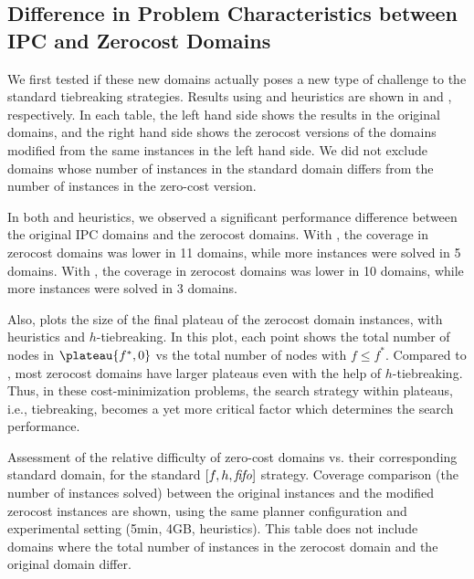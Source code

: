 \subsection{Difference in Problem Characteristics between IPC and Zerocost Domains}

We first tested if these new domains actually poses a new type of challenge to the
standard tiebreaking strategies. Results using \lmcut and \mands
heuristics are shown in  and
, respectively. In each table, the left
hand side shows the results in the original domains, and the right hand side
shows the zerocost versions of the domains modified from the same
instances in the left hand side. We did not exclude domains whose
number of instances in the standard domain differs from the number of instances in the zero-cost version.

In both \lmcut and \mands heuristics, we observed a significant
performance difference between the original IPC domains and the zerocost
domains. With \lmcut, the coverage in zerocost domains
was lower in 11 domains, while more instances were solved
in 5 domains. With \mands, the coverage in zerocost domains was lower in 10 domains, while
more instances were solved in 3 domains.

Also,  plots the size of the final plateau of the
zerocost domain instances, with \lmcut heuristics and $h$-tiebreaking. In this plot,
each point shows the total number of nodes in $\plateau{f^*,0}$ vs the
total number of nodes with $f\leq f^*$. Compared to ,
most zerocost domains have larger plateaus even with the help of
$h$-tiebreaking.  Thus, in these cost-minimization problems, the search
strategy within plateaus, i.e., tiebreaking, becomes a yet more critical
factor which determines the search performance.


\begin{table}[htbp]
 \centering
 
 \caption{
 Assessment of the relative difficulty of zero-cost domains vs. their corresponding standard domain, for the standard $[f,h,{\text{\textit{fifo}}}]$ strategy.
 Coverage comparison (the number of instances solved) 
 between the original instances and the modified zerocost instances are shown, 
 using the same planner configuration and experimental setting (5min, 4GB, \lmcut heuristics).
 This table does not include domains where the total number of instances
 in the zerocost domain  and the original domain differ. 
 }
 \label{tbl:lmcut-zerocost-std}
\end{table}


